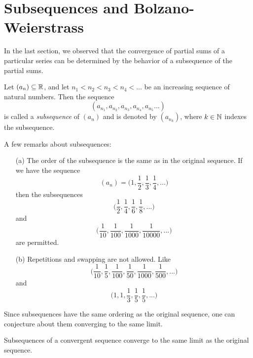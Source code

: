 \section{Subsequences and Bolzano-Weierstrass}

In the last section, we observed that the convergence of partial sums of a particular series can be determined by the behavior of a subsequence of the partial sums. 

\begin{definition}[Subsequences]
Let \( (a_n) \subseteq \mathbb{R} \), and let \( n_1 < n_2 < n_3 < n_4 < \dots\) be an increasing sequence of natural numbers. Then the sequence 
\[ (a_{n_1}, a_{n_2}, a_{n_3}, a_{n_4}, a_{n_5} \dots)\]
is called a \textit{subsequence} of \( (a_n)\) and is denoted by \( (a_{n_k})\), where \( k \in \mathbb{N} \) indexes the subsequence.
\end{definition}%

A few remarks about subsequences: 

\begin{enumerate}
    \item[(a)] The order of the subsequence is the same as in the original sequence.
        If we have the sequence  
        \[ (a_n) = \Big( 1, \frac{1}{2}, \frac{1}{3}, \frac{1}{4}, ...\Big)\]
        then the subsequences 
        \[ \Big( \frac{1}{2}, \frac{1}{4}, \frac{1}{6}, \frac{1}{8},... \Big)\]
        and 
        \[ \Big( \frac{1}{10}, \frac{1}{100}, \frac{1}{1000}, \frac{1}{10000}, ...\Big)\]
        are permitted.
        
    \item[(b)] Repetitions and swapping are not allowed.
        Like 
        \[ \Big( \frac{1}{10}, \frac{1}{5}, \frac{1}{100}, \frac{1}{50}, \frac{1}{1000}, \frac{1}{500},...\Big)\] 
        and 
        \[ \Big( 1,1, \frac{1}{3}, \frac{1}{5}, \frac{1}{5}, ...\Big)\]
        
\end{enumerate}


Since subsequences have the same ordering as the original sequence, one can conjecture about them converging to the same limit. 

\begin{theorem}{}{}
Subsequences of a convergent sequence converge to the same limit as the original sequence.
\end{theorem}


